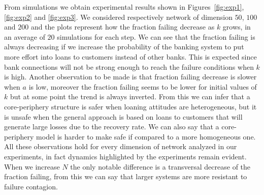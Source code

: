\documentclass[a4paper, 11pt]{article}
\begin{document}
From simulations we obtain experimental results shown in Figures~\ref{fig:exp1}, \ref{fig:exp2} and \ref{fig:exp3}. We considered respectively network of dimension $50$, $100$ and $200$ and the plots represent how the fraction failing decrease as $k$ grows, in an average of $20$ simulations for each step. We can see that the fraction failing is always decreasing if we increase the probability of the banking system to put more effort into loans to customers instead of other banks. This is expected since bank connections will not be strong enough to reach the failure conditions when $k$ is high. Another observation to be made is that fraction failing decrease is slower when $a$ is low, moreover the fraction failing seems to be lower for initial values of $k$ but at some point the trend is always inverted. From this we can infer that a core-periphery structure is safer when loaning attitudes are heterogeneous, but it is unsafe when the general approach is based on loans to customers that will generate large losses due to the recovery rate. We can also say that a core-periphery model is harder to make safe if compared to a more homogeneous one. All these observations hold for every dimension of network analyzed in our experiments, in fact dynamics highlighted by the experiments remain evident. When we increase $N$ the only notable difference is a transversal decrease of the fraction failing, from this we can say that larger systems are more resistant to failure contagion.
\end{document}
